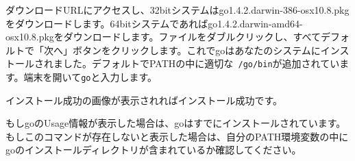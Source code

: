 ダウンロードURLにアクセスし、32bitシステムはgo1.4.2.darwin-386-osx10.8.pkgをダウンロードします。64bitシステムであればgo1.4.2.darwin-amd64-osx10.8.pkgをダウンロードします。ファイルをダブルクリックし、すべてデフォルトで「次へ」ボタンをクリックします。これでgoはあなたのシステムにインストールされました。デフォルトでPATHの中に適切な\texttt{~\//go\//bin}が追加されています。端末を開いて\texttt{go}と入力します。

インストール成功の画像が表示されればインストール成功です。

もしgoのUsage情報が表示した場合は、goはすでにインストールされています。もしこのコマンドが存在しないと表示した場合は、自分のPATH環境変数の中にgoのインストールディレクトリが含まれているか確認してください。


